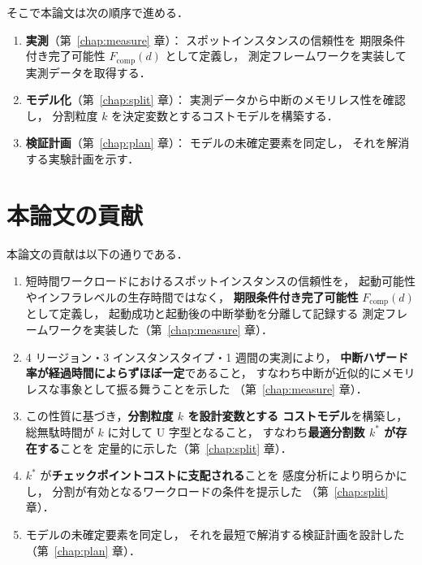 \documentclass[11pt,a4paper]{ltjsreport}
\newcommand{\Fcomp}{F_{\mathrm{comp}}}
\begin{document}
そこで本論文は次の順序で進める．

\begin{enumerate}
  \item \textbf{実測}（第~\ref{chap:measure} 章）：
        スポットインスタンスの信頼性を
        期限条件付き完了可能性 $\Fcomp(d)$ として定義し，
        測定フレームワークを実装して実測データを取得する．
  \item \textbf{モデル化}（第~\ref{chap:split} 章）：
        実測データから中断のメモリレス性を確認し，
        分割粒度 $k$ を決定変数とするコストモデルを構築する．
  \item \textbf{検証計画}（第~\ref{chap:plan} 章）：
        モデルの未確定要素を同定し，
        それを解消する実験計画を示す．
\end{enumerate}

\section{本論文の貢献}

本論文の貢献は以下の通りである．

\begin{enumerate}
  \item 短時間ワークロードにおけるスポットインスタンスの信頼性を，
        起動可能性やインフラレベルの生存時間ではなく，
        \textbf{期限条件付き完了可能性} $\Fcomp(d)$ として定義し，
        起動成功と起動後の中断挙動を分離して記録する
        測定フレームワークを実装した（第~\ref{chap:measure} 章）．
  \item 4 リージョン・3 インスタンスタイプ・1 週間の実測により，
        \textbf{中断ハザード率が経過時間によらずほぼ一定}であること，
        すなわち中断が近似的にメモリレスな事象として振る舞うことを示した
        （第~\ref{chap:measure} 章）．
  \item この性質に基づき，\textbf{分割粒度 $k$ を設計変数とする
        コストモデル}を構築し，
        総無駄時間が $k$ に対して U 字型となること，
        すなわち\textbf{最適分割数 $k^{*}$ が存在する}ことを
        定量的に示した（第~\ref{chap:split} 章）．
  \item $k^{*}$ が\textbf{チェックポイントコストに支配される}ことを
        感度分析により明らかにし，
        分割が有効となるワークロードの条件を提示した
        （第~\ref{chap:split} 章）．
  \item モデルの未確定要素を同定し，
        それを最短で解消する検証計画を設計した
        （第~\ref{chap:plan} 章）．
\end{enumerate}
\end{document}
